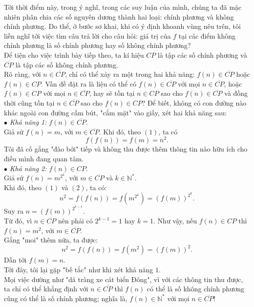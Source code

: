 Tới thời điểm này, trong ý nghĩ, trong các suy luận của mình, chúng ta đã mặc nhiên phân chia các số nguyên dương thành hai loại: chính phương và không chính phương. Do thể, ở bước sơ khai, khi có ý định khoanh vùng nêu trên, tôi liền nghĩ tới việc tìm câu trả lời cho câu hỏi: giá trị của $f$ tại các điểm không chính phương là số chính phương hay số không chính phương?\\ 
Để tiện cho việc trình bày tiếp theo, ta kí hiệu $CP$ là tập các số chính phương và $\overline{CP}$ là tập các số không chính phương.\\
Rõ ràng, với $n\in \overline{CP}$, chỉ có thể xảy ra một trong hai khả năng: $f(n)\in\overline{CP}$ hoặc $f(n)\in CP$. Vấn đề đặt ra là liệu có thể có $f(n)\in\overline{CP}$ với mọi $n\in\overline{CP}$, hoặc $f(n)\in CP$ với mọi $n\in\overline{CP}$, hay sẽ tồn tại $n\in CP$ sao cho $f(n)\in\overline{CP}$ và đồng thời cũng tồn tại $n\in\overline{CP}$ sao cho $f(n)\in CP$? Để biết, không có con đường nào khác ngoài con đường cầm bút, "cắm mặt" vào giấy, xét hai khả năng sau:\\
$\bullet$ \textit{Khả năng 1:} $f(n)\in\overline{CP}$.\\
Giả sử $f(n)=m$, với $m\in\overline{CP}$. Khi đó, theo $(1)$, ta có $$f\left(f\left(n\right)\right)=f\left(m\right)=n^2.$$
Tôi đã cố gắng "đào bới" tiếp và không thu được thêm thông tin nào hữu ích cho điều mình đang quan tâm.\\
$\bullet$ \textit{Khả năng 2:} $f(n)\in CP$.\\
Giả sử $f(n)=m^{2^k}$, với $m\in\overline{CP}$ và $k\in\mathbb{N}^*$.\\
Khi đó, theo $(1)$ và $(2)$, ta có: $$n^2=f\left(f\left(n\right)\right)=f\left(m^{2^k}\right)=\left(f\left(m\right)\right)^{2^k}.$$
Suy ra $n=\left(f\left(m\right)\right)^{2^{k-1}}$.\\
Từ đó, vì $n\in\overline{CP}$ nên phải có $2^{k-1}=1$ hay $k=1$. Như vậy, nếu $f(n)\in CP$ thì $f(n)=m^2$, với $m\in\overline{CP}$.\\
Gắng "moi" thêm nữa, ta được: $$n^2=f\left(f\left(n\right)\right)=f\left(m^2\right)=\left(f\left(m\right)\right)^2.$$
Dẫn tới $f(m)=n.$\\
Tới đây, tôi lại gặp "bế tắc" như khi xét khả năng $1$.\\
Mọi việc dường như "dã tràng xe cát biển Đông", vì với các thông tin thu được, ta chỉ có thể khẳng định với $n\in\overline{CP}$ thì $f(n)$ có thể là số không chính phương cũng có thể là số chính phương; nghĩa là, $f(n)\in\mathbb{N}^*$ với mọi $n\in\overline{CP}$!\\
